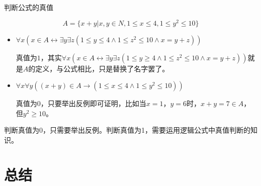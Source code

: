 \documentclass[xetex,10pt,aspectratio=43]{beamer}
\begin{document}
	\begin{frame}{判断公式的真值}
		
		$$A=\{x+y|x,y\in N,1\leqslant x\leqslant 4,1\leqslant y^2\leqslant 10\}$$
		
		\begin{itemize}
			
			\item<1>$\forall x(x\in A\leftrightarrow\exists y\exists z(1\leqslant y\leqslant 4\wedge1\leqslant z^2\leqslant10\wedge x=y+z))$
			
			$\text{真值为1，其实}\forall x(x\in A\leftrightarrow\exists y\exists z(1\leqslant y\geqslant 4\wedge1\leqslant z^2\leqslant10\wedge x=y+z))$就是$A$的定义，与公式相比，只是替换了名字罢了。
			
			\item<1>$\forall x\forall y((x+y)\in A\rightarrow (1\leqslant x\leqslant 4\wedge 1\leqslant y^2\leqslant 10))$
			
			真值为0，只要举出反例即可证明，比如当$x=1$，$y=6$时，$x+y=7\in A$，但$y^2\geqslant 10$。
			
		\end{itemize}
		
		\textcolor{mymauve}{判断真值为0，只需要举出反例。判断真值为1，需要运用逻辑公式中真值判断的知识。}
		
	\end{frame}
	
	\section{总结}
	
\end{document}
